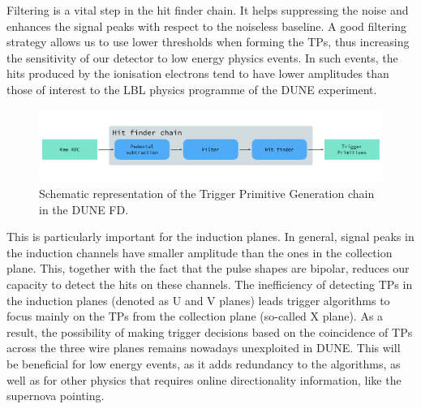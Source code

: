 Filtering is a vital step in the hit finder chain. It helps suppressing the noise and enhances the signal peaks with respect to the noiseless baseline. A good filtering strategy allows us to use lower thresholds when forming the TPs, thus increasing the sensitivity of our detector to low energy physics events. In such events, the hits produced by the ionisation electrons tend to have lower amplitudes than those of interest to the LBL physics programme of the DUNE experiment.

\begin{figure}[t]
	\centering
	\includegraphics[width=0.99\linewidth]{Images/Matched_Filter/trigger_primitive_chain.pdf}
	\caption{Schematic representation of the Trigger Primitive Generation chain in the DUNE FD.}
	\label{fig:tpg_chain}
\end{figure}

This is particularly important for the induction planes. In general, signal peaks in the induction channels have smaller amplitude than the ones in the collection plane. This, together with the fact that the pulse shapes are bipolar, reduces our capacity to detect the hits on these channels. The inefficiency of detecting TPs in the induction planes (denoted as U and V planes) leads trigger algorithms to focus mainly on the TPs from the collection plane (so-called X plane). As a result, the possibility of making trigger decisions based on the coincidence of TPs across the three wire planes remains nowadays unexploited in DUNE. This will be beneficial for low energy events, as it adds redundancy to the algorithms, as well as for other physics that requires online directionality information, like the supernova pointing.

